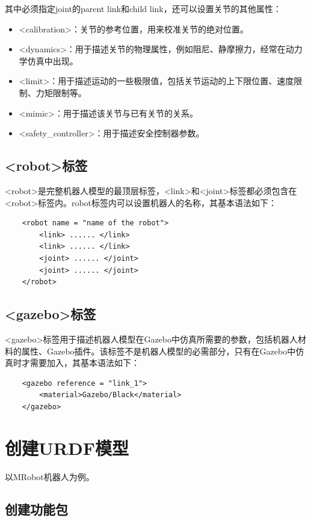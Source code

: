 \documentclass[9pt, oneside]{book}
\begin{document}
其中必须指定joint的parent link和child link，还可以设置关节的其他属性：

\begin{itemize}
    \item <calibration>：关节的参考位置，用来校准关节的绝对位置。
    \item <dynamics>：用于描述关节的物理属性，例如阻尼、静摩擦力，经常在动力学仿真中出现。
    \item <limit>：用于描述运动的一些极限值，包括关节运动的上下限位置、速度限制、力矩限制等。
    \item <mimic>：用于描述该关节与已有关节的关系。
    \item <safety\_controller>：用于描述安全控制器参数。
\end{itemize}

\subsection{<robot>标签}

<robot>是完整机器人模型的最顶层标签，<link>和<joint>标签都必须包含在<robot>标签内。robot标签内可以设置机器人的名称，其基本语法如下：

\begin{verbatim}
    <robot name = "name of the robot">
        <link> ...... </link>
        <link> ...... </link>
        <joint> ...... </joint>
        <joint> ...... </joint>
    </robot>
\end{verbatim}

\subsection{<gazebo>标签}

<gazebo>标签用于描述机器人模型在Gazebo中仿真所需要的参数，包括机器人材料的属性、Gazebo插件。该标签不是机器人模型的必需部分，只有在Gazebo中仿真时才需要加入，其基本语法如下：

\begin{verbatim}
    <gazebo reference = "link_1">
        <material>Gazebo/Black</material>
    </gazebo>
\end{verbatim}

\section{创建URDF模型}

以MRobot机器人为例。

\subsection{创建功能包}
\end{document}
